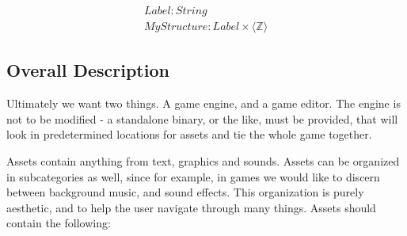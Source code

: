 \begin{equation}
\label{eq:as:e2}
\begin{split}
Label\colon String \\
MyStructure\colon Label \times \langle \mathbb{Z} \rangle
\end{split}
\end{equation}

\subsection{Overall Description} 

Ultimately we want two things. A game engine, and a game editor. The engine is
not to be modified - a standalone binary, or the like, must be provided, that
will look in predetermined locations for assets and tie the whole game
together.

Assets contain anything from text, graphics and sounds. Assets can be organized
in subcategories as well, since for example, in games we would like to discern
between background music, and sound effects. This organization is purely
aesthetic, and to help the user navigate through many things. Assets should
contain the following:

